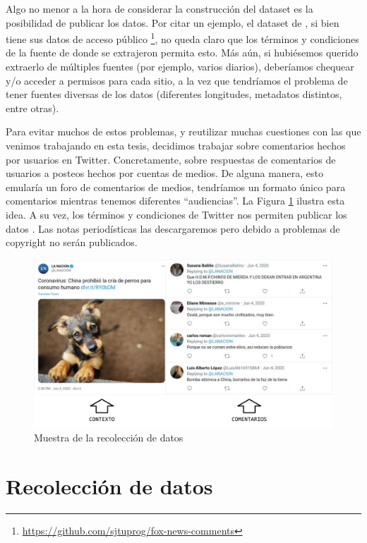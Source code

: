 Algo no menor a la hora de considerar la construcción del dataset es la posibilidad de publicar los datos. Por citar un ejemplo, el dataset de \citet{gao-huang-2017-detecting}, si bien tiene sus datos de acceso público \footnote{\url{https://github.com/sjtuprog/fox-news-comments}}, no queda claro que los términos y condiciones de la fuente de donde se extrajeron permita esto. Más aún, si hubiésemos querido extraerlo de múltiples fuentes (por ejemplo, varios diarios), deberíamos chequear y/o acceder a permisos para cada sitio, a la vez que tendríamos el problema de tener fuentes diversas de los datos (diferentes longitudes, metadatos distintos, entre otras).

Para evitar muchos de estos problemas, y reutilizar muchas cuestiones con las que venimos trabajando en esta tesis, decidimos trabajar sobre comentarios hechos por usuarios en Twitter. Concretamente, sobre respuestas de comentarios de usuarios a posteos hechos por cuentas de medios. De alguna manera, esto emularía un foro de comentarios de medios, tendríamos un formato único para comentarios mientras tenemos diferentes ``audiencias''. La Figura \ref{fig:idea_dataset} ilustra esta idea. A su vez, los términos y condiciones de Twitter nos permiten publicar los datos . Las notas periodísticas las descargaremos pero debido a problemas de copyright no serán publicados.



\begin{figure}
    \centering
    \includegraphics[width=\textwidth]{img/idea_dataset.pdf}
    \caption{Muestra de la recolección de datos}
    \label{fig:idea_dataset}
\end{figure}


\section{Recolección de datos}





